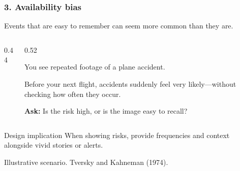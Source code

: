\documentclass{beamer}
\begin{document}
\begin{frame}
    \frametitle{3. Availability bias}
    \small
    Events that are easy to remember can seem more common than they are.
    \medskip
    \begin{columns}[c]
    \begin{column}{0.44\textwidth}
    \centering
    \end{column}
    \begin{column}{0.52\textwidth}

        You see repeated footage of a plane accident.
        \medskip

        Before your next flight, accidents suddenly feel very likely---without checking how often they occur.
        \medskip

        \textbf{Ask:} Is the risk high, or is the image easy to recall?

    \end{column}
    \end{columns}
    \begin{block}{Design implication}
When showing risks, provide frequencies and context alongside vivid stories or alerts.
    \end{block}
    {\tiny Illustrative scenario. Tversky and Kahneman (1974).}
\end{frame}
\end{document}
